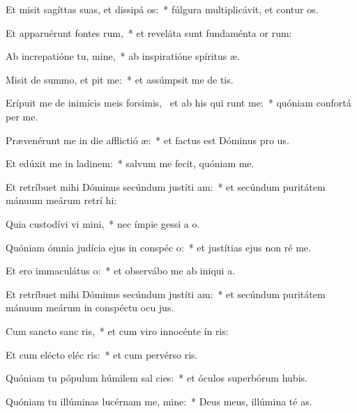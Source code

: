 \item Et misit sagíttas suas, et dissipá os:~* fúlgura multiplicávit, et contur os.
\item Et apparuérunt fontes rum,~* et reveláta sunt fundaménta or rum:
\item Ab increpatióne tu, mine,~* ab inspiratióne spíritus  æ.
\item Misit de summo, et pit me:~* et assúmpsit me de  tis.
\item Erípuit me de inimícis meis forsimis,~\pscross{} et ab his qui runt me:~* quóniam confortá  per me.
\item Prævenérunt me in die afflictió æ:~* et factus est Dóminus pro us.
\item Et edúxit me in ladinem:~* salvum me fecit, quóniam  me.
\item Et retríbuet mihi Dóminus secúndum justíti am:~* et secúndum puritátem mánuum meárum retrí hi:
\item Quia custodívi vi mini,~* nec ímpie gessi a  o.
\item Quóniam ómnia judícia ejus in conspéc o:~* et justítias ejus non ré  me.
\item Et ero immaculátus  o:~* et observábo me ab iniqui a.
\item Et retríbuet mihi Dóminus secúndum justíti am:~* et secúndum puritátem mánuum meárum in conspéctu ocu jus.
\item Cum sancto sanc ris,~* et cum viro innocénte ín ris:
\item Et cum elécto eléc ris:~* et cum pervérso ris.
\item Quóniam tu pópulum húmilem sal cies:~* et óculos superbórum hubis.
\item Quóniam tu illúminas lucérnam me, mine:~* Deus meus, illúmina té as.

